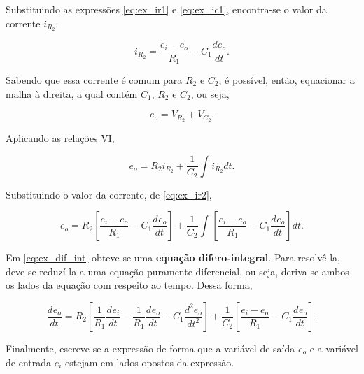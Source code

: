 \documentclass{article}
\numberwithin{equation}{section}
\newcommand{\deo}[1]{\dfrac{d^{#1}e_o}{dt^{#1}}}
\newcommand{\dei}[1]{\dfrac{d^{#1}e_i}{dt^{#1}}}
\let\l\left
\let\r\right
\let\dfr\dfrac
\begin{document}
\noindent Substituindo as expressões \eqref{eq:ex_ir1} e \eqref{eq:ex_ic1}, encontra-se o valor da corrente $i_{R_2}$.

\begin{equation}
    i_{R_2} = \dfrac{e_i-e_o}{R_1} - C_1 \dfrac{de_o}{dt}. \label{eq:ex_ir2}
\end{equation}

\noindent Sabendo que essa corrente é comum para $R_2$ e $C_2$, é possível, então, equacionar a malha à direita, a qual contém $C_1$, $R_2$ e $C_2$, ou seja,

\begin{equation*}
    e_o = V_{R_2} + V_{C_2}.
\end{equation*}

\noindent Aplicando as relações VI,

\begin{equation*}
    e_o = R_2i_{R_2} + \dfrac{1}{C_2}\int i_{R_2}dt.
\end{equation*}

\noindent Substituindo o valor da corrente, de \eqref{eq:ex_ir2},

\begin{equation}
    e_o = R_2\left[\dfrac{e_i-e_o}{R_1}-C_1 \deo{}\right] + \dfrac{1}{C_2} \int \left[\dfrac{e_i-e_o}{R_1} - C_1 \deo{}\right]dt \label{eq:ex_dif_int}.
\end{equation}

\noindent Em \eqref{eq:ex_dif_int} obteve-se uma \textbf{equação difero-integral}. Para resolvê-la, deve-se reduzí-la a uma equação puramente diferencial, ou seja, deriva-se ambos os lados da equação com respeito ao tempo. Dessa forma,

\begin{equation*}
    \deo{} = R_2\l[\dfr{1}{R_1}\dei{}-\dfr{1}{R_1}\deo{}-C_1 \deo{2}\r] + \dfr{1}{C_2}\l[\dfr{e_i-e_o}{R_1} - C_1 \deo{}\r].
\end{equation*}

Finalmente, escreve-se a expressão de forma que a variável de saída $e_{o}$ e a variável de entrada $e_{i}$ estejam em lados opostos da expressão.
\end{document}
